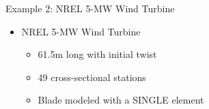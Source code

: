 \documentclass[xcolor=cmyk]{beamer}
\begin{document}
\begin{frame}{Example 2: NREL 5-MW Wind Turbine}
     \begin{itemize}
         \item NREL 5-MW Wind Turbine
             \begin{itemize}
                 \item 61.5m long with initial twist
                 \item 49 cross-sectional stations
                 \item Blade modeled with a SINGLE element
             \end{itemize}
    \end{itemize}  
\end{frame}
\end{document}
